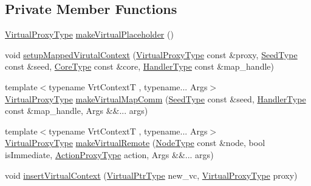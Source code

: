 \subsection*{Private Member Functions}
\begin{DoxyCompactItemize}
\item 
\hyperlink{namespacevt_a1b417dd5d684f045bb58a0ede70045ac}{Virtual\+Proxy\+Type} \hyperlink{structvt_1_1vrt_1_1_virtual_context_manager_ae3cb983e08d10e841b85782ada02967d}{make\+Virtual\+Placeholder} ()
\item 
void \hyperlink{structvt_1_1vrt_1_1_virtual_context_manager_ab9a6382cf116ad07b1ab223ce98405eb}{setup\+Mapped\+Virutal\+Context} (\hyperlink{namespacevt_a1b417dd5d684f045bb58a0ede70045ac}{Virtual\+Proxy\+Type} const \&proxy, \hyperlink{namespacevt_ae2e13198bdef4d5b8e603d6c1c7f0969}{Seed\+Type} const \&seed, \hyperlink{namespacevt_a74b11b22c02feaabab8591acc87c7c52}{Core\+Type} const \&core, \hyperlink{namespacevt_af64846b57dfcaf104da3ef6967917573}{Handler\+Type} const \&map\+\_\+handle)
\item 
{\footnotesize template$<$typename Vrt\+ContextT , typename... Args$>$ }\\\hyperlink{namespacevt_a1b417dd5d684f045bb58a0ede70045ac}{Virtual\+Proxy\+Type} \hyperlink{structvt_1_1vrt_1_1_virtual_context_manager_ac0707436352437160375252ec9953675}{make\+Virtual\+Map\+Comm} (\hyperlink{namespacevt_ae2e13198bdef4d5b8e603d6c1c7f0969}{Seed\+Type} const \&seed, \hyperlink{namespacevt_af64846b57dfcaf104da3ef6967917573}{Handler\+Type} const \&map\+\_\+handle, Args \&\&... args)
\item 
{\footnotesize template$<$typename Vrt\+ContextT , typename... Args$>$ }\\\hyperlink{namespacevt_a1b417dd5d684f045bb58a0ede70045ac}{Virtual\+Proxy\+Type} \hyperlink{structvt_1_1vrt_1_1_virtual_context_manager_a7236496fc6ffb6f4b9631a5024008178}{make\+Virtual\+Remote} (\hyperlink{namespacevt_a866da9d0efc19c0a1ce79e9e492f47e2}{Node\+Type} const \&node, bool is\+Immediate, \hyperlink{namespacevt_a102aa105d64254d89f7e585d106c95aa}{Action\+Proxy\+Type} action, Args \&\&... args)
\item 
void \hyperlink{structvt_1_1vrt_1_1_virtual_context_manager_a398fd80620aad8ff9ba5fa9964a661a6}{insert\+Virtual\+Context} (\hyperlink{structvt_1_1vrt_1_1_virtual_context_manager_a24dd2acbbd37a53f4e4108d385a58441}{Virtual\+Ptr\+Type} new\+\_\+vc, \hyperlink{namespacevt_a1b417dd5d684f045bb58a0ede70045ac}{Virtual\+Proxy\+Type} proxy)
\item 

\end{DoxyCompactItemize}
